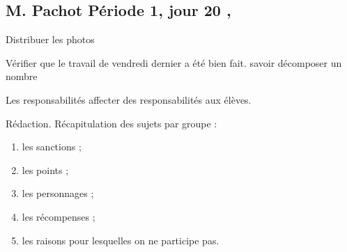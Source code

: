 \documentclass{article}
\begin{document}
\reversemarginpar
	\setlength{\parskip}{2.8ex}
	
\subsection*{M. Pachot \hfill Période 1, jour 20 \hfill {} \sep}

	\nte Distribuer les photos

	\dis\cfr{}

	\dis\cma{} Vérifier que le travail de vendredi dernier a été bien fait.
	\obj savoir décomposer un nombre


	\dIs\cge{} Les responsabilités
	\obj affecter des responsabilités aux élèves.

	\dIs\cpr{} Rédaction. Récapitulation des sujets par groupe :
	\begin{enumerate}
		\item les sanctions ;
		\item les points ;
		\item les personnages ;
		\item les récompenses ;
		\item les raisons pour lesquelles on ne participe pas.
	\end{enumerate}
	
	\dev



%
%
\end{document}
